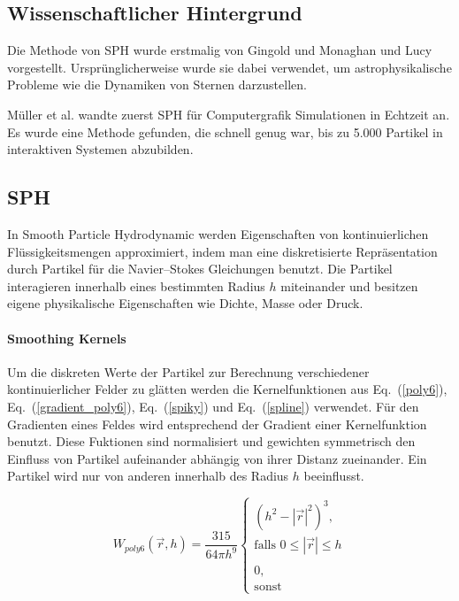 \documentclass[a4paper]{paper}
\renewcommand{\eqref}[1]{Eq.~(\ref{#1})}
\begin{document}
\subsection{Wissenschaftlicher Hintergrund}
Die Methode von SPH wurde erstmalig von Gingold und Monaghan \citep{gingold1977smoothed} und Lucy \citep{lucy1977numerical} vorgestellt. Ursprünglicherweise wurde sie dabei verwendet, um astrophysikalische Probleme wie die Dynamiken von Sternen darzustellen.

Müller et al. \citep{muller2003particle} wandte zuerst SPH für Computergrafik Simulationen in Echtzeit an. Es wurde eine Methode gefunden, die schnell genug war, bis zu 5.000 Partikel in interaktiven Systemen abzubilden.


\subsection{SPH}
In Smooth Particle Hydrodynamic werden Eigenschaften von kontinuierlichen Flüssigkeitsmengen approximiert, indem man eine diskretisierte Repräsentation durch Partikel für die Navier–Stokes Gleichungen benutzt. 
Die Partikel interagieren innerhalb eines bestimmten Radius $h$ miteinander und besitzen eigene physikalische Eigenschaften wie  Dichte, Masse oder Druck.



\paragraph{Smoothing Kernels}
Um die diskreten Werte der Partikel zur Berechnung verschiedener kontinuierlicher Felder zu glätten werden die Kernelfunktionen aus \eqref{poly6}, \eqref{gradient_poly6}, \eqref{spiky} und \eqref{spline} verwendet. Für den Gradienten eines Feldes wird entsprechend der Gradient einer Kernelfunktion benutzt. Diese Fuktionen sind normalisiert und gewichten symmetrisch den Einfluss von Partikel aufeinander abhängig von ihrer Distanz zueinander. Ein Partikel wird nur von anderen innerhalb des Radius $h$ beeinflusst.

\begin{equation}
\label{poly6}
W_{poly6}(\vec{r},h) = \frac{315}{64 \pi h^9} 
\begin{cases}
(h^2-|\vec{r}|^2)^3, \\ \text{falls } 0 \leq |\vec{r}| \leq h \\
\\
0, \\ \text{sonst}
\end{cases}
\end{equation}
\end{document}
